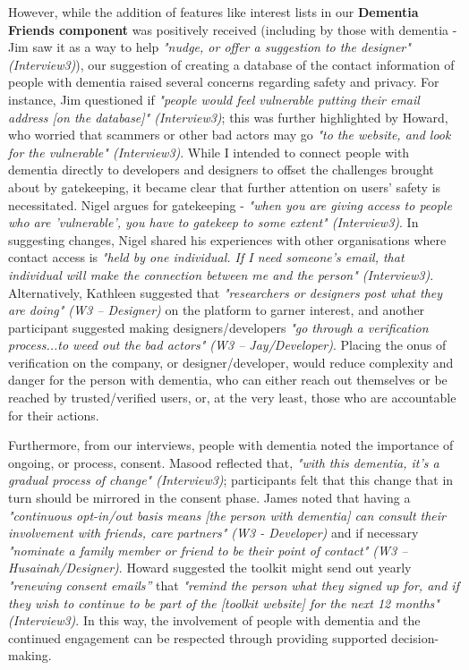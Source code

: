 However, while the addition of features like interest lists in our \textbf{Dementia Friends component} was positively received (including by those with dementia - Jim saw it as a way to help \textit{"nudge, or offer a suggestion to the designer" (Interview3)}), our suggestion of creating a database of the contact information of people with dementia raised several concerns regarding safety and privacy. For instance, Jim questioned if \textit{"people would feel vulnerable putting their email address [on the database]" (Interview3)}; this was further highlighted by Howard, who worried that scammers or other bad actors may go \textit{"to the website, and look for the vulnerable" (Interview3)}. While I intended to connect people with dementia directly to developers and designers to offset the challenges brought about by gatekeeping, it became clear that further attention on users’ safety is necessitated. Nigel argues for gatekeeping - \textit{"when you are giving access to people who are 'vulnerable', you have to gatekeep to some extent" (Interview3)}. In suggesting changes, Nigel shared his experiences with other organisations where contact access is \textit{"held by one individual. If I need someone's email, that individual will make the connection between me and the person" (Interview3)}. Alternatively, Kathleen suggested that \textit{"researchers or designers post what they are doing" (W3 – Designer)} on the platform to garner interest, and another participant suggested making designers/developers \textit{"go through a verification process...to weed out the bad actors" (W3 – Jay/Developer)}. Placing the onus of verification on the company, or designer/developer, would reduce complexity and danger for the person with dementia, who can either reach out themselves or be reached by trusted/verified users, or, at the very least, those who are accountable for their actions. 

Furthermore, from our interviews, people with dementia noted the importance of ongoing, or process, consent. Masood reflected that, \textit{"with this dementia, it's a gradual process of change" (Interview3)}; participants felt that this change that in turn should be mirrored in the consent phase. James noted that having a \textit{"continuous opt-in/out basis means [the person with dementia] can consult their involvement with friends, care partners" (W3 - Developer)} and if necessary \textit{"nominate a family member or friend to be their point of contact" (W3 – Husainah/Designer)}. Howard suggested the toolkit might send out yearly \textit{"renewing consent emails”} that \textit{"remind the person what they signed up for, and if they wish to continue to be part of the [toolkit website] for the next 12 months" (Interview3)}. In this way, the involvement of people with dementia and the continued engagement can be respected through providing supported decision-making. 

